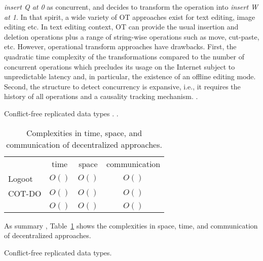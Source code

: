 \begin{asparadesc}
  \emph{insert Q at 0} as concurrent, and decides to transform the operation
  into \emph{insert W at 1}.  In that spirit, a wide variety of OT approaches
  exist for text editing, image editing etc. In text editing context, OT can
  provide the usual insertion and deletion operations plus a range of
  string-wise operations such as move, cut-paste, etc. However, operational
  transform approaches have drawbacks. First, the quadratic time complexity of
  the transformations compared to the number of concurrent operations which
  precludes its usage on the Internet subject to unpredictable latency and, in
  particular, the existence of an offline editing mode. Second, the structure to
  detect concurrency is expansive, i.e., it requires the history of all
  operations and a causality tracking mechanism. .
\item [Conflict-free replicated data types]. .

\begin{table}
  \centering
  \begin{tabular}{@{}lccc@{}}
    \toprule
    & time & space & communication \\ \cmidrule{2-4}
    Logoot & $O()$ & $O()$ & $O()$ \\ \midrule
    COT-DO & $O()$ & $O()$ & $O()$ \\ \midrule
    \LSEQ  & $O()$ & $O()$ & $O()$ \\ \bottomrule
  \end{tabular}
  \caption{\label{table:complexities}Complexities in time, space, and communication of decentralized approaches.}
\end{table}


\item [As summary], Table~\ref{table:complexities} shows the complexities in
  space, time, and communication of decentralized approaches. 
\end{asparadesc}

\begin{algorithm}
  
  \caption{\label{algo:crdtabsract}Conflict-free replicated data types.}
\end{algorithm}


